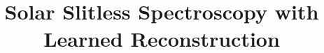 \documentclass[linenumbers,twocolumn]{aastex7}
\begin{document}
\title{Solar Slitless Spectroscopy with Learned Reconstruction}

\end{document}
